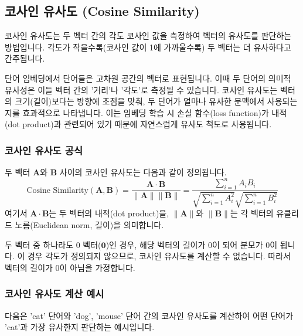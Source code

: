 \documentclass[11pt,a4paper]{article}
\theoremstyle{definition}
\begin{document}
\newpage
\subsection{코사인 유사도 (Cosine Similarity)}
코사인 유사도는 두 벡터 간의 각도 코사인 값을 측정하여 벡터의 유사도를 판단하는 방법입니다. 각도가 작을수록(코사인 값이 1에 가까울수록) 두 벡터는 더 유사하다고 간주됩니다.

\begin{infobox}
단어 임베딩에서 단어들은 고차원 공간의 벡터로 표현됩니다. 이때 두 단어의 의미적 유사성은 이들 벡터 간의 '거리'나 '각도'로 측정될 수 있습니다. 코사인 유사도는 벡터의 크기(길이)보다는 방향에 초점을 맞춰, 두 단어가 얼마나 유사한 문맥에서 사용되는지를 효과적으로 나타냅니다. 이는 임베딩 학습 시 손실 함수(loss function)가 내적(dot product)과 관련되어 있기 때문에 자연스럽게 유사도 척도로 사용됩니다.
\end{infobox}

\subsubsection{코사인 유사도 공식}
두 벡터 $\mathbf{A}$와 $\mathbf{B}$ 사이의 코사인 유사도는 다음과 같이 정의됩니다.
\begin{equation*}
\text{Cosine Similarity}(\mathbf{A}, \mathbf{B}) = \frac{\mathbf{A} \cdot \mathbf{B}}{\|\mathbf{A}\| \|\mathbf{B}\|} = \frac{\sum_{i=1}^{n} A_i B_i}{\sqrt{\sum_{i=1}^{n} A_i^2} \sqrt{\sum_{i=1}^{n} B_i^2}}
\end{equation*}
여기서 $\mathbf{A} \cdot \mathbf{B}$는 두 벡터의 내적(dot product)을, $\|\mathbf{A}\|$와 $\|\mathbf{B}\|$는 각 벡터의 유클리드 노름(Euclidean norm, 길이)을 의미합니다.

\begin{warningbox}
두 벡터 중 하나라도 0 벡터($\mathbf{0}$)인 경우, 해당 벡터의 길이가 0이 되어 분모가 0이 됩니다. 이 경우 각도가 정의되지 않으므로, 코사인 유사도를 계산할 수 없습니다. 따라서 벡터의 길이가 0이 아님을 가정합니다.
\end{warningbox}

\subsubsection{코사인 유사도 계산 예시}
다음은 'cat' 단어와 'dog', 'mouse' 단어 간의 코사인 유사도를 계산하여 어떤 단어가 'cat'과 가장 유사한지 판단하는 예시입니다.
\end{document}
